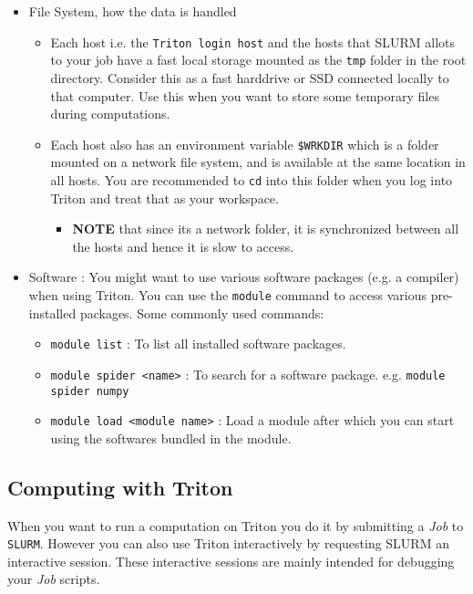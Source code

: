 \documentclass[a4paper,11pt]{article}
\begin{document}
\begin{itemize}
    \item File System, how the data is handled
        \begin{itemize}
            \item Each host i.e. the \texttt{Triton login host} and the hosts that SLURM allots to your job have a fast local storage mounted as the \texttt{tmp} folder in the root directory. Consider this as a fast harddrive or SSD connected locally to that computer. Use this when you want to store some temporary files during computations.
            \item Each host also has an environment variable \texttt{\$WRKDIR} which is a folder mounted on a network file system, and is available at the same location in all hosts. You are recommended to \texttt{cd} into this folder when you log into Triton and treat that as your workspace. 
            \begin{itemize}
            \item \textbf{NOTE} that since its a network folder, it is synchronized between all the hosts and hence it is slow to access.
	        \end{itemize}
        \end{itemize}
    \item Software : You might want to use various software packages (e.g.
        a compiler) when using Triton. You can use the \texttt{module} command to access various pre-installed packages. Some commonly used commands:
        \begin{itemize}
            \item \texttt{module list} : To list all installed software packages.
            \item \texttt{module spider <name>} : To search for a software package. e.g. \texttt{module spider numpy} 
            \item \texttt{module load <module name>} : Load a module after which you can start using the softwares bundled in the module.
        \end{itemize}
\end{itemize}
\subsection{Computing with Triton}

When you want to run a computation on Triton you do it by submitting a \textit{Job} to \texttt{SLURM}. However you can also use Triton interactively by requesting SLURM an interactive session. These interactive sessions are mainly intended for debugging your \textit{Job} scripts.
\end{document}
